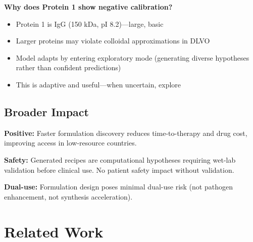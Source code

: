 \documentclass[11pt]{article}
\begin{document}
\textbf{Why does Protein 1 show negative calibration?}
\begin{itemize}
    \item Protein 1 is IgG (150 kDa, pI 8.2)—large, basic
    \item Larger proteins may violate colloidal approximations in DLVO
    \item Model adapts by entering exploratory mode (generating diverse hypotheses rather than confident predictions)
    \item This is adaptive and useful—when uncertain, explore
\end{itemize}

\subsection{Broader Impact}

\textbf{Positive:} Faster formulation discovery reduces time-to-therapy and drug cost, improving access in low-resource countries.

\textbf{Safety:} Generated recipes are computational hypotheses requiring wet-lab validation before clinical use. No patient safety impact without validation.

\textbf{Dual-use:} Formulation design poses minimal dual-use risk (not pathogen enhancement, not synthesis acceleration).

\section{Related Work}
\end{document}
